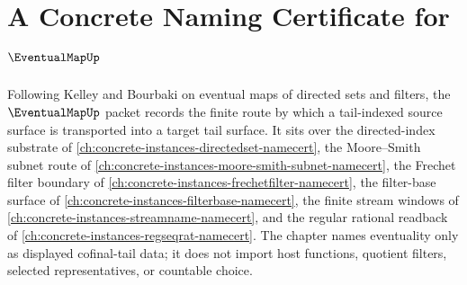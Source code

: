 \chapter{A Concrete Naming Certificate for $\EventualMapUp$}
\label{ch:concrete-instances-eventual-map-namecert}

Following Kelley and Bourbaki on eventual maps of directed sets and filters, the $\EventualMapUp$ packet records the finite route by which a tail-indexed source surface is transported into a target tail surface. It sits over the directed-index substrate of \autoref{ch:concrete-instances-directedset-namecert}, the Moore--Smith subnet route of \autoref{ch:concrete-instances-moore-smith-subnet-namecert}, the Frechet filter boundary of \autoref{ch:concrete-instances-frechetfilter-namecert}, the filter-base surface of \autoref{ch:concrete-instances-filterbase-namecert}, the finite stream windows of \autoref{ch:concrete-instances-streamname-namecert}, and the regular rational readback of \autoref{ch:concrete-instances-regseqrat-namecert}. The chapter names eventuality only as displayed cofinal-tail data; it does not import host functions, quotient filters, selected representatives, or countable choice.

